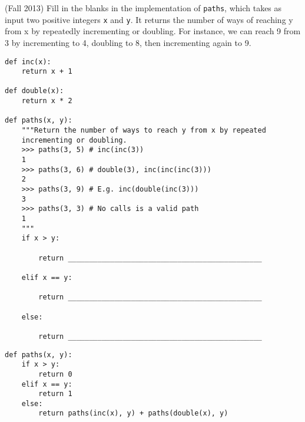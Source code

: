 \question (Fall 2013) Fill in the blanks in the implementation of
\texttt{paths}, which takes as input two positive integers \texttt{x} and
\texttt{y}. It returns the number of ways of reaching y from x by repeatedly
incrementing or doubling. For instance, we can reach 9 from 3 by incrementing to
4, doubling to 8, then incrementing again to 9.

\medskip

\begin{lstlisting}
def inc(x):
    return x + 1

def double(x):
    return x * 2

def paths(x, y):
    """Return the number of ways to reach y from x by repeated
    incrementing or doubling.
    >>> paths(3, 5) # inc(inc(3))
    1
    >>> paths(3, 6) # double(3), inc(inc(inc(3)))
    2
    >>> paths(3, 9) # E.g. inc(double(inc(3)))
    3
    >>> paths(3, 3) # No calls is a valid path
    1
    """
    if x > y:

        return ______________________________________________

    elif x == y:

        return ______________________________________________

    else:

        return ______________________________________________
\end{lstlisting}
\begin{solution}
\begin{lstlisting}
def paths(x, y):
    if x > y:
        return 0
    elif x == y:
        return 1
    else:
        return paths(inc(x), y) + paths(double(x), y)
\end{lstlisting}
\end{solution}

\clearpage